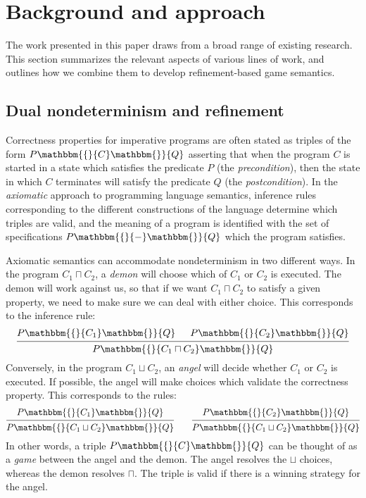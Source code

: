 \documentclass[sigplan,screen]{acmart}
\newcommand{\htr}[3]{{ {#1} \mathbbm{\{} {#2} \mathbbm{\}} {#3} }}
\begin{document}



\section{Background and approach} \label{sec:background} %


The work presented in this paper
draws from a broad range of existing research.
This section summarizes the relevant aspects
of various lines of work,
and outlines how we combine them
to develop
refinement-based game semantics.


\subsection{Dual nondeterminism and refinement} \label{sec:refcal} %


Correctness properties for imperative programs
are often stated as triples of the form $\htr{P}{C}{Q}$
asserting that
when the program $C$ is started in a state which
satisfies the predicate $P$ (the \emph{precondition}),
then the state in which $C$ terminates
will satisfy the predicate $Q$ (the \emph{postcondition}).
In the \emph{axiomatic} approach to programming language semantics,
inference rules
corresponding to the different constructions of the language
determine which triples are valid,
and the meaning of a program is identified with
the set of specifications $\htr{P}{-}{Q}$
which the program satisfies.

Axiomatic semantics
can accommodate nondeterminism in two different ways.
In the program $C_1 \sqcap C_2$,
a \emph{demon} will choose which of $C_1$ or $C_2$ is executed.
The demon will work against us,
so that if we want $C_1 \sqcap C_2$ to satisfy a given property,
we need to make sure we can deal with either choice.
This corresponds to the inference rule:
\[
  \begin{prooftree}
    \hypo{\htr{P}{C_1}{Q}}
    \hypo{\htr{P}{C_2}{Q}}
    \infer2{\htr{P}{C_1 \sqcap C_2}{Q}}
  \end{prooftree}
\]
Conversely,
in the program $C_1 \sqcup C_2$,
an \emph{angel} will decide whether $C_1$ or $C_2$ is executed.
If possible,
the angel will make choices which validate
the correctness property.
This corresponds to the rules:
\[
  \begin{prooftree}
    \hypo{\htr{P}{C_1}{Q}}
    \infer1{\htr{P}{C_1 \sqcup C_2}{Q}}
  \end{prooftree}
  \qquad
  \begin{prooftree}
    \hypo{\htr{P}{C_2}{Q}}
    \infer1{\htr{P}{C_1 \sqcup C_2}{Q}}
  \end{prooftree}
\]
In other words,
a triple $\htr{P}{C}{Q}$
can be thought of as a \emph{game}
between the angel and the demon.
The angel resolves the $\sqcup$ choices,
whereas the demon resolves $\sqcap$.
The triple is valid if there is a winning strategy
for the angel.
\end{document}
